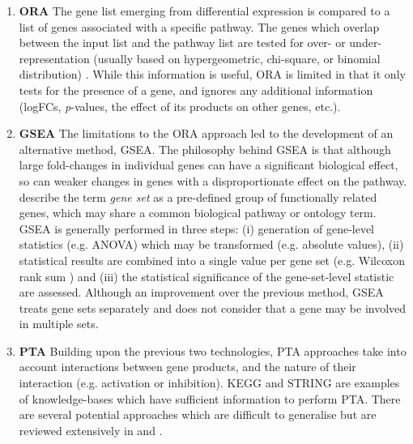 \begin{enumerate}
\item[] \textbf{\ac{ORA}} \hspace{0.15cm} The gene list emerging from differential expression is compared to a list of genes associated with a specific pathway. The genes which overlap between the input list and the pathway list are tested for over- or under-representation (usually based on hypergeometric, chi-square, or binomial distribution) \citep{khatri2012ten}. While this information is useful, ORA is limited in that it only tests for the presence of a gene, and ignores any additional information (\ac{logFC}s, \textit{p}-values, the effect of its products on other genes, etc.).

\item[] \textbf{\ac{GSEA}} \hspace{0.15cm} The limitations to the ORA approach led to the development of an alternative method, GSEA. The philosophy behind \ac{GSEA} is that although large fold-changes in individual genes can have a significant biological effect, so can weaker changes in genes with a disproportionate effect on the pathway. \cite{luo2009gage} describe the term \textit{gene set} as a pre-defined group of functionally related genes, which may share a common biological pathway or ontology term. \ac{GSEA} is generally performed in three steps: (i) generation of gene-level statistics (e.g. ANOVA) which may be transformed (e.g. absolute values), (ii) statistical results are combined into a single value per gene set (e.g. Wilcoxon rank sum \citep{barry2005significance}) and (iii) the statistical significance of the gene-set-level statistic are assessed. Although an improvement over the previous method, \ac{GSEA} treats gene sets separately and does not consider that a gene may be involved in multiple sets.

\item[] \textbf{\ac{PTA}} \hspace{0.15cm} Building upon the previous two technologies, \ac{PTA} approaches take into account interactions between gene products, and the nature of their interaction (e.g. activation or inhibition). KEGG and STRING \citep{szklarczyk2019string} are examples of knowledge-bases which have sufficient information to perform \ac{PTA}. There are several potential approaches which are difficult to generalise but are reviewed extensively in \cite{ihnatova2018critical} and \cite{ma2019comparative}.
\end{enumerate} 


